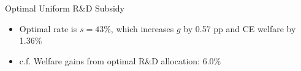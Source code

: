 \documentclass[
  10pt,
  aspectratio=169,   %
]{beamer}
\theoremstyle{plain}
\begin{document}
\begin{frame}{Optimal Uniform R\&D Subsidy}
  \begin{center}
    \begin{figure}
      \centering
      \setcounter{subfigure}{0}
    \end{figure}
  \end{center}
  \begin{itemize}
    \item Optimal rate is $s=43\%$, which increases $g$ by 0.57 pp and CE welfare by 1.36\%
    \item c.f. Welfare gains from optimal R\&D allocation: 6.0\% 
  \end{itemize}
\end{frame}
\end{document}
